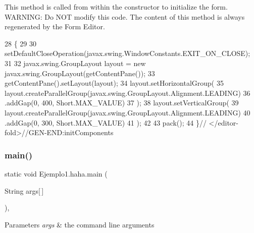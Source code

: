 This method is called from within the constructor to initialize the form. W\+A\+R\+N\+I\+NG\+: Do N\+OT modify this code. The content of this method is always regenerated by the Form Editor. 
\begin{DoxyCode}
28                                   \{
29 
30         setDefaultCloseOperation(javax.swing.WindowConstants.EXIT\_ON\_CLOSE);
31 
32         javax.swing.GroupLayout layout = \textcolor{keyword}{new} javax.swing.GroupLayout(getContentPane());
33         getContentPane().setLayout(layout);
34         layout.setHorizontalGroup(
35             layout.createParallelGroup(javax.swing.GroupLayout.Alignment.LEADING)
36             .addGap(0, 400, Short.MAX\_VALUE)
37         );
38         layout.setVerticalGroup(
39             layout.createParallelGroup(javax.swing.GroupLayout.Alignment.LEADING)
40             .addGap(0, 300, Short.MAX\_VALUE)
41         );
42 
43         pack();
44     \}\textcolor{comment}{// </editor-fold>//GEN-END:initComponents}
\end{DoxyCode}
\mbox{\label{class_ejemplo1_1_1haha_a6bc2ebbd0d6117662d8f6b2bfefcce94}} 
\subsubsection{\texorpdfstring{main()}{main()}}
{\footnotesize\ttfamily static void Ejemplo1.\+haha.\+main (\begin{DoxyParamCaption}\item[{String}]{args\mbox{[}$\,$\mbox{]} }\end{DoxyParamCaption})\hspace{0.3cm}{\ttfamily [inline]}, {\ttfamily [static]}}


\begin{DoxyParams}{Parameters}
{\em args} & the command line arguments \\
\hline
\end{DoxyParams}

